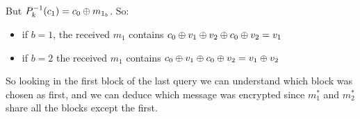 \documentclass[11pt]{article}
\newcounter{t0d0_counter}
\begin{document}
\begin{figure}[h!]
   \centering
   \sdinit{}
\end{figure}
But $P_{k}^{-1}(c_{1})=c_{0} \oplus m_{1_{b}}$. So:

\begin{itemize}
    \item if $b=1$, the received $m_{1}$  contains  $c_{0} \oplus v_{1} \oplus v_{2} \oplus c_{0} \oplus v_{2}= v_{1} $
    \item if $b=2$ the received $m_{1}$ contains $c_{0} \oplus v_{1} \oplus c_{0} \oplus v_{2}= v_{1} \oplus v_{2}$
\end{itemize}
So looking in the first block of the last query we can understand which block
was chosen as first, and we can deduce which message was encrypted since
$m_{1}^{*}$ and $m_{2}^{*}$ share all the blocks except the first.
\end{document}
